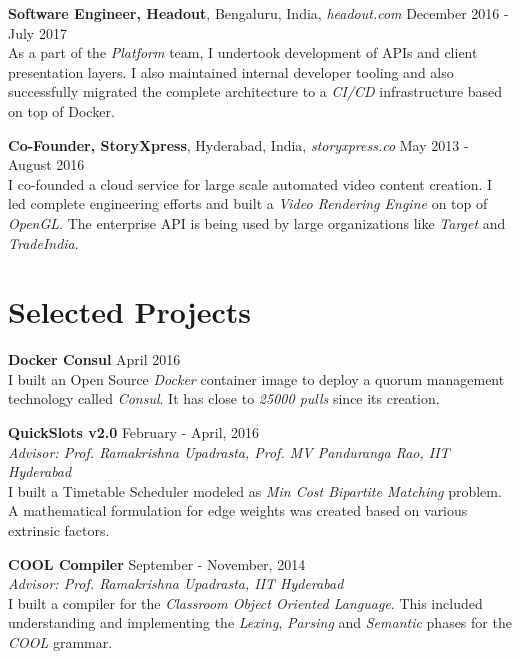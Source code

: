 \documentclass[margin,line]{res}
\begin{document}
\begin{resume}
  {\bf Software Engineer, Headout}, Bengaluru, India, {\it headout.com}  \hfill December 2016 - July 2017 \\
    As a part of the {\it Platform} team, I undertook development of APIs and client presentation layers. I also maintained internal developer tooling and also successfully migrated the complete architecture to a {\it CI/CD} infrastructure based on top of Docker.

  \vspace*{-3.5mm}

  {\bf Co-Founder, StoryXpress}, Hyderabad, India, {\it storyxpress.co}  \hfill May 2013 - August 2016 \\
    I co-founded a cloud service for large scale automated video content creation. I led complete engineering efforts and built a {\it Video Rendering Engine} on top of {\it OpenGL}. The enterprise API is being used by large organizations like {\it Target} and {\it TradeIndia}.

  \vspace*{-3.5mm}

\section{\sc Selected Projects}

  {\bf Docker Consul} \hfill April 2016 \\
	I built an Open Source {\it Docker} container image to deploy a quorum management technology called {\it Consul}. It has close to {\em 25000 pulls} since its creation.

  \vspace*{-3.5mm}

  {\bf QuickSlots v2.0} \hfill February - April, 2016 \\
  	{\it Advisor: Prof. Ramakrishna Upadrasta, Prof. MV Panduranga Rao, IIT Hyderabad} \vspace{0.15 \baselineskip} \\
    I built a Timetable Scheduler modeled as {\em Min Cost Bipartite Matching} problem. A mathematical formulation for edge weights was created based on various extrinsic factors.

  \vspace*{-3.5mm}

  {\bf COOL Compiler} \hfill September - November, 2014 \\
  	{\it Advisor: Prof. Ramakrishna Upadrasta, IIT Hyderabad} \vspace{0.15 \baselineskip} \\
  	I built a compiler for the {\it Classroom Object Oriented Language}. This included understanding and implementing the {\em Lexing}, {\em Parsing} and {\em Semantic} phases for the {\it COOL} grammar.


\end{resume}
\end{document}
